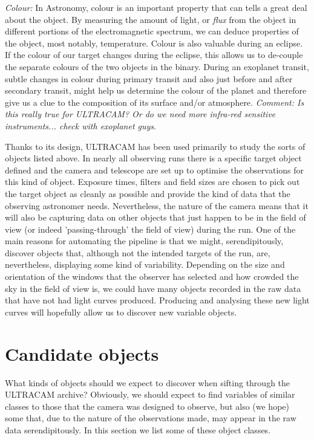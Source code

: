 \emph{Colour:} In Astronomy, colour is an important property that can tells a great deal about the object. By measuring the amount of light, or \emph{flux} from the object in different portions of the electromagnetic spectrum, we can deduce properties of the object, most notably, temperature. Colour is also valuable during an eclipse. If the colour of our target changes during the eclipse, this allows us to de-couple the separate colours of the two objects in the binary. During an exoplanet transit, subtle changes in colour during primary transit and also just before and after secondary transit, might help us determine the colour of the planet and therefore give us a clue to the composition of its surface and/or atmosphere. \emph{Comment: Is this really true for ULTRACAM? Or do we need more infra-red sensitive instruments... check with exoplanet guys}. 

Thanks to its design, ULTRACAM has been used primarily to study the sorts of objects listed above. In nearly all observing runs there is a specific target object defined and the camera and telescope are set up to optimise the observations for this kind of object. Exposure times, filters and field sizes are chosen to pick out the target object as cleanly as possible and provide the kind of data that the observing astronomer needs. Nevertheless, the nature of the camera means that it will also be capturing data on other objects that just happen to be in the field of view (or indeed 'passing-through' the field of view) during the run. One of the main reasons for automating the pipeline is that we might, serendipitously, discover objects that, although not the intended targets of the run, are, nevertheless, displaying some kind of variability. Depending on the size and orientation of the windows that the observer has selected and how crowded the sky in the field of view is, we could have many objects recorded in the raw data that have not had light curves produced. Producing and analysing these new light curves will hopefully allow us to discover new variable objects. 

\section{Candidate objects}
What kinds of objects should we expect to discover when sifting through the ULTRACAM archive? Obviously, we should expect to find variables of similar classes to those that the camera was designed to observe, but also (we hope) some that, due to the nature of the observations made, may appear in the raw data serendipitously.  In this section we list some of these object classes. 

